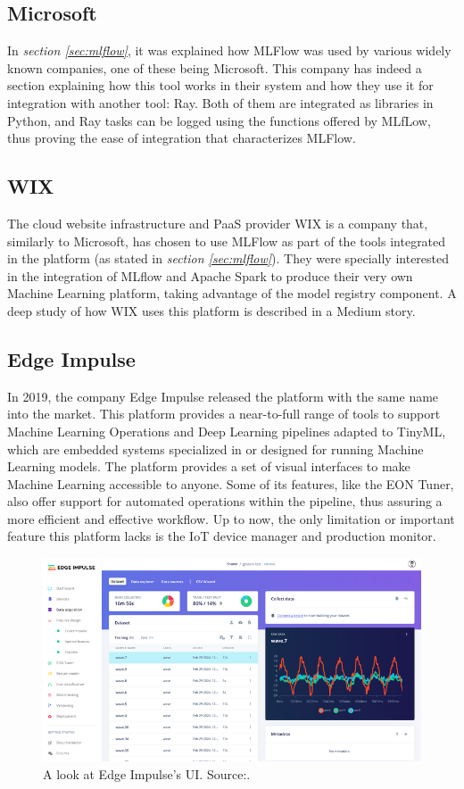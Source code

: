 \subsection{Microsoft}
In \emph{section \ref{sec:mlflow}}, it was explained how MLFlow was used by various widely known companies, one of these being Microsoft. This company has indeed 
a section explaining how this tool works in their system and how they use it for integration with another tool: Ray\cite{microsoftmlflow}. Both of them are integrated 
as libraries in Python, and Ray tasks can be logged using the functions offered by MLfLow, thus proving the ease of integration that characterizes MLFlow.

\subsection{WIX}
The cloud website infrastructure and \acrshort{PaaS} provider WIX is a company that, similarly to Microsoft, has chosen to use MLFlow as part of the tools integrated in
the platform (as stated in \emph{section \ref{sec:mlflow}}). They were specially interested in the integration of MLflow and Apache Spark to produce their very own Machine
Learning platform, taking advantage of the model registry component. A deep study of how WIX uses this platform is described in a Medium story\cite{mediumwix}.

\subsection{Edge Impulse}
In 2019, the company Edge Impulse released the platform with the same name into the market. This platform provides a near-to-full range of tools to support Machine 
Learning Operations and Deep Learning pipelines adapted to TinyML, which are embedded systems specialized in or designed for running Machine Learning models. The 
platform provides a set of visual interfaces to make Machine Learning accessible to anyone. Some of its features, like the EON Tuner, also offer support for automated 
operations within the pipeline, thus assuring a more efficient and effective workflow. Up to now, the only limitation or important feature this platform lacks is the 
\acrshort{IoT} device manager and production monitor\cite{edgeimpulse}.

\begin{figure}[H]
    \centering
    \includegraphics[width=0.8\linewidth]{figs/edgeimpulse-ui.png}
    \caption{A look at Edge Impulse's \acrshort{UI}. Source:\cite{edgeimpulsedocs}.}
    \label{fig:edgeImpulseUI}
\end{figure}

